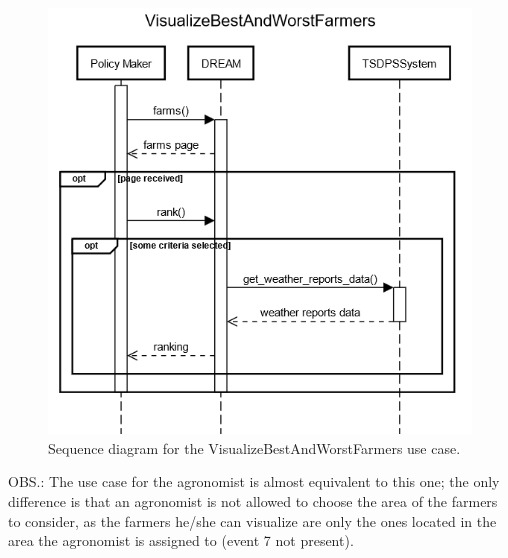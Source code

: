 \documentclass{article}
\begin{document}
\begin{figure}[H]
    \centering
	\includegraphics[scale=0.5]{sequence_diagrams/VisualizeBestAndWorstFarmers.png}
    \caption{Sequence diagram for the VisualizeBestAndWorstFarmers use case.}
\end{figure}
OBS.: The use case for the agronomist is almost equivalent to this one; the only difference is that an agronomist is not allowed to choose the area of the farmers to consider, as the farmers he/she can visualize are only the ones located in the area the agronomist is assigned to (event 7 not present).
\newpage
\end{document}
